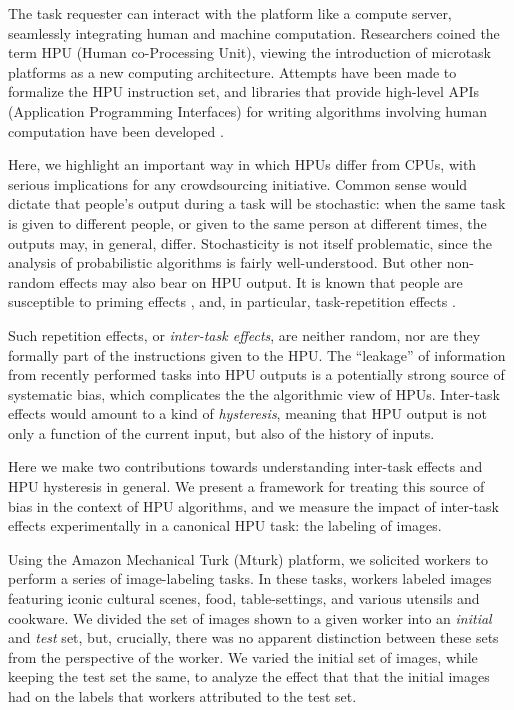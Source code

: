 \documentclass[12pt]{article}
\begin{document}
The task requester can interact with the platform like a compute server, 
seamlessly 
integrating human and machine computation.  Researchers coined the 
term HPU (Human co-Processing Unit), viewing the introduction 
of microtask platforms as a new computing architecture\cite{5543192}.  
Attempts have been made to formalize the HPU instruction set, and libraries 
that provide high-level APIs (Application Programming Interfaces) for writing 
algorithms involving human computation have been developed \cite{little2010turkit,minder2011crowdlang,minder2012crowdlang,kittur2011crowdforge}.

Here, we highlight an important way in which HPUs differ from CPUs, with 
serious implications for any crowdsourcing initiative.  Common sense would 
dictate that people's output during a task will be stochastic: when the same
task is given to different people, or given to the same person at different 
times,
the outputs may, in general, differ.  Stochasticity is not itself problematic,
since the analysis of probabilistic algorithms is fairly 
well-understood. But other non-random effects may also bear on HPU output. 
It is known that people are susceptible to priming effects 
\cite{BJOP1796,No2007,beller1971priming}, and, in particular, task-repetition 
effects \cite{Gass1999549,sohn2001task}.  

Such repetition effects, or
\textit{inter-task effects}, are neither random, nor are they formally part 
of the instructions given to the HPU.  The ``leakage'' of information from 
recently performed tasks into HPU outputs is a potentially strong source of 
systematic bias, which complicates the the algorithmic view of HPUs. 
Inter-task effects would amount to a kind of \textit{hysteresis}, meaning 
that HPU output is not only a function of the current input, but also of the 
history of inputs.  

Here we make two contributions towards understanding inter-task effects
and HPU hysteresis in general.  We present a framework for treating this 
source of bias in the context of HPU algorithms, and we measure the impact of
inter-task effects experimentally in a canonical HPU task: the labeling of 
images.

Using the  Amazon Mechanical Turk (Mturk) platform, we solicited workers to 
perform a series of image-labeling tasks.  
In these tasks, workers labeled images featuring iconic cultural scenes,
food, table-settings, and various utensils and cookware. We divided the set of 
images shown to a given worker into an \textit{initial} and \textit{test} set, 
but, crucially, there was no apparent distinction between these sets from the
perspective of the worker.  We varied the initial set of images, while 
keeping the test set the same, to analyze the effect that that the initial 
images had on the labels that workers attributed to the test set.
\end{document}
